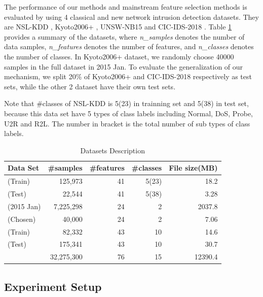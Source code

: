 \documentclass{ieeeaccess}
\theoremstyle{definition}
\begin{document}
The performance of our methods and mainstream feature selection methods is evaluated by using 4 classical and new network intrusion detection datasets. They are NSL-KDD \cite{nsl-kdd}, Kyoto2006+ \cite{kyoto2006}, UNSW-NB15 \cite{UNSWNB2015} and CIC-IDS-2018 \cite{CIC-IDS-2018}. 
Table \ref{tab:datasets} provides a summary of the datasets, where \emph{n\_samples} denotes the number of data samples, \emph{n\_features} denotes the number of features, and \emph{n\_classes} denotes the number of classes. 
In Kyoto2006+ dataset, we randomly choose 40000 samples in the full dataset in 2015 Jan. 
To evaluate the generalization of our mechanism, we split 20\% of Kyoto2006+ and CIC-IDS-2018 respectively as test sets, while the other 2 dataset have their own test sets.

Note that \#classes of NSL-KDD is 5(23) in trainning set and 5(38) in test set, because this data set have 5 types of class labels including Normal, DoS, Probe, U2R and R2L. The number in bracket is the total number of sub types of class labels.

\begin{table}[!htbp]
    \centering
    \caption{Datasets Description}
        \begin{tabular}{lrrrr}
        \toprule
        Data Set                    & \#samples & \#features & \#classes & File size(MB) \\
        \midrule
        \cite{nsl-kdd}(Train)            & 125,973    & 41    & 5(23) & 18.2      \\
        \cite{nsl-kdd}(Test)                           & 22,544     & 41    & 5(38) & 3.28      \\
        \cite{kyoto2006}(2015 Jan)    & 7,225,298   & 24    & 2     & 2037.8    \\
        \cite{kyoto2006}(Chosen)             & 40,000     & 24    & 2     & 7.06      \\
        \cite{UNSWNB2015}(Train)       & 82,332     & 43    & 10    & 14.6      \\
        \cite{UNSWNB2015}(Test)                         & 175,341    & 43    & 10    & 30.7      \\
        \cite{CIC-IDS-2018}         & 32,275,300  & 76    & 15    & 12390.4   \\
        \bottomrule
        \end{tabular}%
    \label{tab:datasets}%
\end{table}%

\subsection{Experiment Setup}
\end{document}
